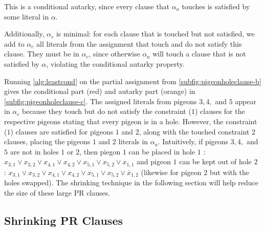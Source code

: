 This is a conditional autarky, since every clause that $\alpha_a$ touches is
satisfied by some literal in $\alpha$.

Additionally, $\alpha_c$ is minimal: for each clause that is touched but not
satisfied, we add to $\alpha_c$ all literals from the assignment that touch and do
not satisfy this clause. They must be in $\alpha_c$, since otherwise $\alpha_a$
will touch a clause that is not satisfied by $\alpha$, violating the conditional
autarky property.

Running \autoref{alg:leastcond} on the partial assignment from \autoref{subfig:pigeonholeclause-b}  
gives the conditional part (red) and autarky part (orange) in \autoref{subfig:pigeonholeclause-c}. 
The assigned literals from pigeons $3,4,$ and $5$ appear in $\alpha_c$ because they touch 
but do not satisfy the constraint ($1$) clauses for the respective pigeons stating that every pigeon is in a hole. 
However, the constraint ($1$) clauses are satisfied for pigeons $1$ and $2$, 
along with the touched constraint $2$ clauses, placing the pigeons $1$ and $2$ literals in $\alpha_a$. 
Intuitively, if pigeons $3,4,$ and $5$ are not in holes $1$ or $2$, then piegon $1$ can be placed in hole $1$ : 
$x_{3,1} \lor x_{3,2} \lor x_{4,1} \lor x_{4,2} \lor x_{5,1} \lor x_{5,2} \lor x_{1,1} $ and pigeon $1$ can be kept out of hole $2$ :
$x_{3,1} \lor x_{3,2} \lor x_{4,1} \lor x_{4,2} \lor x_{5,1} \lor x_{5,2} \lor \overline{x}_{1,2} $ (likewise for pigeon $2$ but with the holes swapped). 
The shrinking technique in the following section will help reduce the size of these large PR clauses. 



\subsection{Shrinking PR Clauses}~\label{subsec:shrinking}

